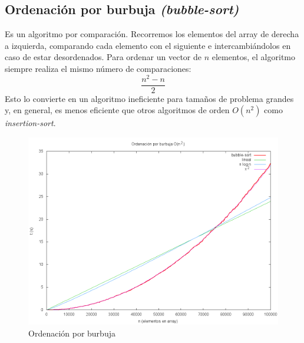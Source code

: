\subsection{Ordenación por burbuja \textit{(bubble-sort)}}
Es un algoritmo por comparación.  Recorremos los elementos del array de derecha a izquierda, comparando cada elemento con el siguiente e intercambiándolos en caso de estar desordenados.  Para ordenar un vector de $n$ elementos, el algoritmo siempre realiza el mismo número de comparaciones:
\[\frac{n^2 - n}{2}\]
Esto lo convierte en un algoritmo ineficiente para tamaños de problema grandes y, en general, es menos eficiente que otros algoritmos de orden $O(n^2)$ como \textit{insertion-sort}.
	\begin{figure}[H]
	  \centering
	    \includegraphics[width=1.0\textwidth]{bubble-sort.png}
	  \caption{Ordenación por burbuja}
	  \label{fig:bubble}
	\end{figure}

